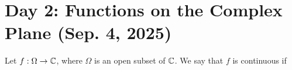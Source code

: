 \section{Day 2: Functions on the Complex Plane (Sep. 4, 2025)}
Let $f : \Omega \to \mathbb C$, where $\Omega$ is an open subset of $\mathbb C$. We say that $f$ is continuous if 